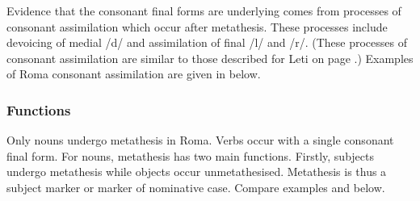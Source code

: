 \begin{exe}
	\label{ex:RomVC->CVMet}
\end{exe}

Evidence that the consonant final forms are underlying
comes from processes of consonant assimilation which occur after metathesis.
These processes include devoicing of medial /d/ and
assimilation of final /l/ and /r/.
(These processes of consonant assimilation 
are similar to those described for Leti on page .)
Examples of Roma consonant assimilation are given in  below.

\begin{exe}
	\label{ex:RomConAss}
\end{exe}

\subsubsection{Functions}\label{sec:RomFun}
Only nouns undergo metathesis in Roma.
Verbs occur with a single consonant final form.
For nouns, metathesis has two main functions.
Firstly, subjects undergo metathesis while objects occur unmetathesised.
Metathesis is thus a subject marker or marker of nominative case.
Compare examples  and  below.


